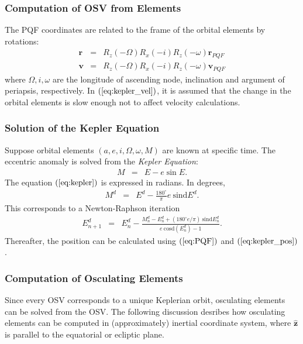 \documentclass [12pt, a4paper] {article}
\newcommand{\sind}
{
	\textrm{sind}
}
\newcommand{\cosd}
{
	\textrm{cosd}
}
\newcommand{\vu}[1]
{
	\mathbf{\hat #1}
}
\newcommand{\vc}[1]
{
	\boldsymbol{#1}
}
\begin{document}
\subsubsection{Computation of OSV from Elements}
The PQF coordinates are related to the frame of the orbital elements by 
rotations:
\begin {eqnarray}
  \label{eq:kepler_pos}
  \vc r &=& R_z(-\Omega)R_x(-i)R_z(-\omega) \vc r_{PQF}\\
  \label{eq:kepler_vel}
  \vc v &=& R_z(-\Omega)R_x(-i)R_z(-\omega) \vc v_{PQF}
\end {eqnarray}
where $\Omega, i, \omega$ are the longitude of ascending node, inclination 
and argument of periapsis, respectively. In $(\ref{eq:kepler_vel})$, it is 
assumed that the change in the orbital elements is slow enough not to affect 
velocity calculations.

\subsubsection{Solution of the Kepler Equation}
Suppose orbital elements $(a, e, i, \Omega, \omega, M)$ are known at 
specific time. The eccentric anomaly is solved from the \emph{Kepler Equation}:
\begin {eqnarray}
  \label{eq:kepler}
  M &=& E - e\sin E.
\end {eqnarray}
The equation $(\ref{eq:kepler})$ is expressed in radians. In degrees,
\begin {eqnarray}
\label{eq:kepler_deg}
M^d &=& E^d - \frac{180^\circ}{\pi}e\:\sind E^d.
\end {eqnarray}
This corresponds to a Newton-Raphson iteration
\begin {eqnarray}
  E^d_{n+1} &=& E^d_n 
  - 
  \frac{M_n^d - E_n^d + (180^\circ e/\pi)\:\sind{E_n^d}}{e\:\cosd(E_n^d) - 1}.
\end {eqnarray}
Thereafter, the position can be calculated using $(\ref{eq:PQF})$ and 
$(\ref{eq:kepler_pos})$.

\subsubsection{Computation of Osculating Elements}
Since every OSV corresponds to a unique Keplerian orbit, osculating elements 
can be solved from the OSV. The following discussion desribes how osculating
elements can be computed in (approximately) inertial coordinate system, where 
$\vu z$ is parallel to the equatorial or ecliptic plane. 
\end{document}
